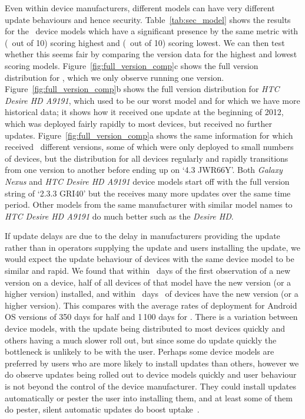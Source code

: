 Even within device manufacturers, different models can have very different update behaviours and hence security.
Table~\ref{tab:sec_model} shows the results for the \daNumSigModels\ device models which have a significant presence by the same metric with \emph{\daSecScoreBestmodel} (\daSecScoreBestmodelScore\ out of 10) scoring highest and \emph{\daSecScoreWorstmodel} (\daSecScoreWorstmodelScore\ out of 10) scoring lowest.
We can then test whether this seems fair by comparing the version data for the highest and lowest scoring models.
Figure~\ref{fig:full_version_comp}c shows the full version distribution for \emph{\daSecScoreWorstmodel}, which we only observe running one version.
Figure~\ref{fig:full_version_comp}b shows the full version distribution for \emph{HTC Desire HD A9191}, which used to be our worst model and for which we have more historical data; it shows how it received one update at the beginning of 2012, which was deployed fairly rapidly to most devices, but received no further updates.
Figure~\ref{fig:full_version_comp}a shows the same information for \emph{\daSecScoreBestmodel} which received \daSecScoreBestmodelNumFullVersions\ different versions, some of which were only deployed to small numbers of devices, but the distribution for all devices regularly and rapidly transitions from one version to another before ending up on `4.3 JWR66Y'.
Both \emph{Galaxy Nexus} and \emph{HTC Desire HD A9191} device models start off with the full version string of `2.3.3 GRI40' but the \emph{\daSecScoreBestmodel} receives many more updates over the same time period.
Other models from the same manufacturer with similar model names to \emph{HTC Desire HD A9191} do much better such as the \emph{Desire HD}.

If update delays are due to the delay in manufacturers providing the update rather than in operators supplying the update and users installing the update, we would expect the update behaviour of devices with the same device model to be similar and rapid.
We found that within \daModelHalfDeployment\ days of the first observation of a new version on a device, half of all devices of that model have the new version (or a higher version) installed, and within \daModelFullDeployment\ days \daFullDeployedAt\ of devices have the new version (or a higher version).
This compares with the average rates of deployment for Android OS versions of 350 days for half and 1\,100 days for \daFullDeployedAt.
There is a variation between device models, with the update being distributed to most devices quickly and others having a much slower roll out, but since some do update quickly the bottleneck is unlikely to be with the user.
Perhaps some device models are preferred by users who are more likely to install updates than others, however we do observe updates being rolled out to device models quickly and user behaviour is not beyond the control of the device manufacturer.
They could install updates automatically or pester the user into installing them, and at least some of them do pester, silent automatic updates do boost uptake~\cite{Duebendorfer2009}.

